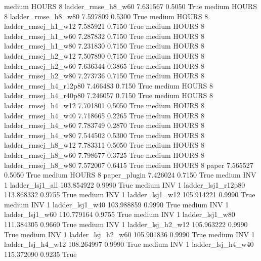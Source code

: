    medium    HOURS                 8     ladder_rmse_h8_w60   7.631567      0.5050    True
    medium    HOURS                 8     ladder_rmse_h8_w80   7.597809      0.5300    True
    medium    HOURS                 8    ladder_rmsej_h1_w12   7.585921      0.7150    True
    medium    HOURS                 8    ladder_rmsej_h1_w60   7.287832      0.7150    True
    medium    HOURS                 8    ladder_rmsej_h1_w80   7.231830      0.7150    True
    medium    HOURS                 8    ladder_rmsej_h2_w12   7.507890      0.7150    True
    medium    HOURS                 8    ladder_rmsej_h2_w60   7.636344      0.3865    True
    medium    HOURS                 8    ladder_rmsej_h2_w80   7.273736      0.7150    True
    medium    HOURS                 8 ladder_rmsej_h4_r12p80   7.466483      0.7150    True
    medium    HOURS                 8 ladder_rmsej_h4_r40p80   7.246057      0.7150    True
    medium    HOURS                 8    ladder_rmsej_h4_w12   7.701801      0.5050    True
    medium    HOURS                 8    ladder_rmsej_h4_w40   7.718665      0.2265    True
    medium    HOURS                 8    ladder_rmsej_h4_w60   7.783749      0.2870    True
    medium    HOURS                 8    ladder_rmsej_h4_w80   7.544502      0.5300    True
    medium    HOURS                 8    ladder_rmsej_h8_w12   7.783311      0.5050    True
    medium    HOURS                 8    ladder_rmsej_h8_w60   7.798677      0.3725    True
    medium    HOURS                 8    ladder_rmsej_h8_w80   7.572007      0.6415    True
    medium    HOURS                 8                  paper   7.565527      0.5050    True
    medium    HOURS                 8           paper_plugin   7.426024      0.7150    True
    medium      INV                 1        ladder_lsj1_all 103.854922      0.9990    True
    medium      INV                 1     ladder_lsj1_r12p80 113.868332      0.9755    True
    medium      INV                 1        ladder_lsj1_w12 105.914221      0.9990    True
    medium      INV                 1        ladder_lsj1_w40 103.988859      0.9990    True
    medium      INV                 1        ladder_lsj1_w60 110.779164      0.9755    True
    medium      INV                 1        ladder_lsj1_w80 111.384305      0.9660    True
    medium      INV                 1      ladder_lsj_h2_w12 105.963222      0.9990    True
    medium      INV                 1      ladder_lsj_h2_w60 105.901836      0.9990    True
    medium      INV                 1      ladder_lsj_h4_w12 108.264997      0.9990    True
    medium      INV                 1      ladder_lsj_h4_w40 115.372090      0.9235    True
